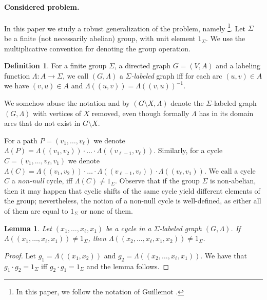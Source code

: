 \documentclass[11pt]{article}
\newtheorem{lemma}[theorem]{Lemma}
\theoremstyle{definition}
\newtheorem{definition}[theorem]{Definition}
\newcommand{\gfvs}{{\sc{Group Feedback Vertex Set}}\xspace}
\newcommand{\fvsshort}{{\sc{FVS}}}
\begin{document}
\paragraph{Considered problem.} In this paper we study a robust generalization of the \fvsshort{} problem, namely \gfvs{}\footnote{In this paper, we follow the notation of Guillemot \cite{guillemot-journal}.}.
Let $\Sigma$ be a finite (not necessarily abelian) group, with unit element $1_\Sigma$.
We use the multiplicative convention for denoting the group operation.

\begin{definition}
For a finite group $\Sigma$, a directed graph $G=(V,A)$ and
a labeling function $\Lambda:A \rightarrow \Sigma$, we call $(G,\Lambda)$ 
a {\em $\Sigma$-labeled} graph iff for each arc $(u,v) \in A$ we have $(v,u) \in A$
and $\Lambda((u,v)) = \Lambda((v,u))^{-1}$.
\end{definition}

We somehow abuse the notation and by $(G\setminus X, \Lambda)$ denote
the $\Sigma$-labeled graph $(G, \Lambda)$ with vertices of $X$ removed,
even though formally $\Lambda$ has in its domain arcs that do not exist in $G\setminus X$.

For a path $P=(v_1,\ldots,v_{\ell})$ we denote $\Lambda(P)=\Lambda((v_1,v_2)) \cdot \ldots \cdot \Lambda((v_{\ell-1},v_{\ell}))$.
Similarly, for a cycle $C=(v_1,\ldots,v_{\ell},v_1)$ we denote $\Lambda(C)=\Lambda((v_1,v_2)) \cdot \ldots \cdot \Lambda((v_{\ell-1},v_{\ell})) \cdot \Lambda((v_{\ell},v_1))$.
We call a cycle $C$ a {\em non-null} cycle, iff $\Lambda(C)\not= 1_\Sigma$.
Observe that if the group $\Sigma$ is non-abelian, then it may happen that cyclic shifts of the same cycle yield different elements of the group; nevertheless, the notion of a non-null cycle is well-defined, as either all of them are equal to $1_\Sigma$ or none of them.

\begin{lemma}
Let $(x_1,\ldots,x_\ell,x_1)$ be a cycle in a $\Sigma$-labeled graph $(G,\Lambda)$.
If $\Lambda((x_1,\ldots,x_\ell,x_1)) \not= 1_\Sigma$, then $\Lambda((x_2,\ldots,x_{\ell},x_1,x_2))\not= 1_\Sigma$.
\end{lemma}

\begin{proof}
Let $g_1 = \Lambda((x_1,x_2))$ and $g_2=\Lambda((x_2,\ldots,x_{\ell},x_1))$. 
We have that $g_1 \cdot g_2 = 1_\Sigma$ iff $g_2 \cdot g_1 = 1_\Sigma$ and the lemma follows.
\end{proof}
\end{document}
